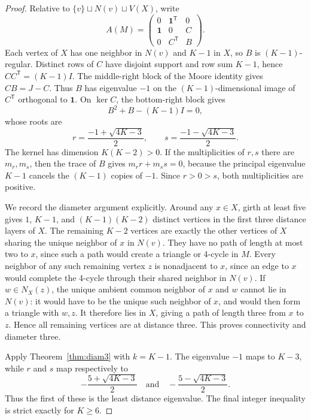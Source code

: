 \documentclass[a4paper,11pt,reqno]{amsart}
\theoremstyle{plain}
\theoremstyle{definition}
\theoremstyle{remark}
\newcommand{\one}{\mathbf 1}
\begin{document}
\begin{proof}
Relative to \(\{v\}\sqcup N(v)\sqcup V(X)\), write
\[
 A(M)=
 \begin{pmatrix}
 0&\one^{\mathsf T}&0\\
 \one&0&C\\
 0&C^{\mathsf T}&B
 \end{pmatrix}.
\]
Each vertex of \(X\) has one neighbor in \(N(v)\) and \(K-1\) in \(X\),
so \(B\) is \((K-1)\)-regular.  Distinct rows of \(C\) have disjoint support
and row sum \(K-1\), hence \(CC^{\mathsf T}=(K-1)I\).  The middle-right
block of the Moore identity gives \(CB=J-C\).  Thus \(B\) has eigenvalue
\(-1\) on the \((K-1)\)-dimensional image of \(C^{\mathsf T}\) orthogonal
to \(\one\).  On \(\ker C\), the bottom-right block gives
\[
 B^2+B-(K-1)I=0,
\]
whose roots are
\[
 r=\frac{-1+\sqrt{4K-3}}2,
 \qquad
 s=\frac{-1-\sqrt{4K-3}}2.
\]
The kernel has dimension \(K(K-2)>0\).  If the multiplicities of \(r,s\)
there are \(m_r,m_s\), then the trace of \(B\) gives
\(m_rr+m_ss=0\), because the principal eigenvalue \(K-1\) cancels the
\((K-1)\) copies of \(-1\).  Since \(r>0>s\), both multiplicities are
positive.

We record the diameter argument explicitly.  Around any \(x\in X\), girth
at least five gives \(1\), \(K-1\), and \((K-1)(K-2)\) distinct vertices in
the first three distance layers of \(X\).  The remaining \(K-2\) vertices are
exactly the other vertices of \(X\) sharing the unique neighbor of \(x\) in
\(N(v)\).  They have no path of length at most two to \(x\), since such a
path would create a triangle or 4-cycle in \(M\).  Every neighbor of any such
remaining vertex \(z\) is nonadjacent to \(x\), since an edge to \(x\) would
complete the 4-cycle through their shared neighbor in \(N(v)\).  If
\(w\in N_X(z)\), the unique ambient common neighbor of \(x\) and \(w\) cannot
lie in \(N(v)\): it would have to be the unique such neighbor of \(x\), and
would then form a triangle with \(w,z\).  It therefore lies in \(X\), giving
a path of length three from \(x\) to \(z\).  Hence all remaining vertices are
at distance three.  This proves connectivity and diameter three.

Apply Theorem~\ref{thm:diam3} with \(k=K-1\).  The eigenvalue \(-1\) maps
to \(K-3\), while \(r\) and \(s\) map respectively to
\[
 -\frac{5+\sqrt{4K-3}}2
 \quad\text{and}\quad
 -\frac{5-\sqrt{4K-3}}2.
\]
Thus the first of these is the least distance eigenvalue.
The final integer inequality is strict exactly for \(K\ge6\).
\end{proof}
\end{document}
